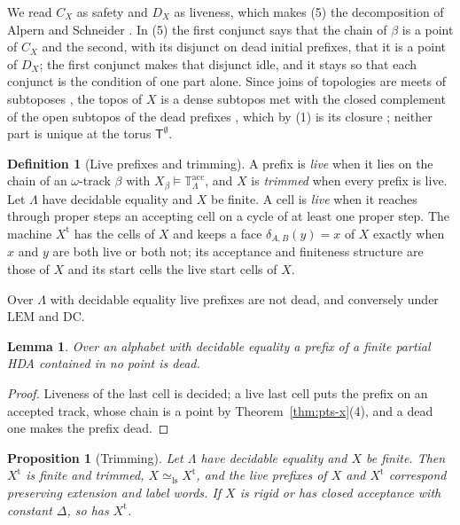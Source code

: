 \documentclass{lmcs}
\newtheorem{lemma}[theorem]{Lemma}
\newtheorem{proposition}[theorem]{Proposition}
\theoremstyle{definition}
\newtheorem{definition}[theorem]{Definition}
\theoremstyle{remark}
\newcommand{\Tt}{\mathbb{T}}
\newcommand{\prin}[1]{\mathrm{#1}}
\newcommand{\EM}{\prin{LEM}}
\newcommand{\eqLs}{\simeq_{\mathrm{ls}}}
\newcommand{\trim}[1]{#1^{\mathrm{t}}}
\providecommand{\DC}{\prin{DC}}
\providecommand{\Tacc}{\Tt^{\mathrm{acc}}_{\Lambda}}
\providecommand{\TB}[1]{\mathsf{T}^{#1}}
\begin{document}
We read $C_X$ as safety and $D_X$ as liveness, which makes (5) the decomposition of Alpern and Schneider \cite{AS85}.
In (5) the first conjunct says that the chain of $\beta$ is a point of $C_X$ and the second, with its disjunct on dead
initial prefixes, that it is a point of $D_X$; the
first conjunct makes that disjunct idle, and it stays so that each conjunct is the condition of one part alone. Since joins of
topologies are meets of subtoposes \cite{CL25b}\cite[Section~A4.5]{Johnstone02},
the topos of $X$ is a dense subtopos met with the closed complement of the open subtopos of the dead prefixes
\cite{CL25b},
which by (1) is its closure \cite{Caramello09}; neither part is
unique at the torus $\TB{\emptyset}$.

\begin{definition}[Live prefixes and trimming]\label{def:trim}
A prefix is \emph{live} when it lies on the chain of an $\omega$-track $\beta$ with
$X_\beta\models\Tacc$, and $X$ is \emph{trimmed} when every prefix is
live. Let $\Lambda$ have decidable equality and $X$ be finite. A cell is \emph{live} when it
reaches through proper steps an accepting cell on a cycle of at least one proper
step. The machine $\trim{X}$ has the cells of $X$ and keeps a face
$\delta_{A,B}(y)=x$ of $X$ exactly when $x$ and $y$ are both live or both not; its acceptance and
finiteness structure are those of $X$ and its start cells the live start cells of
$X$.
\end{definition}

Over $\Lambda$ with decidable equality live prefixes are not dead, and
conversely under $\EM$ and $\DC$.

\begin{lemma}\label{lem:no-point-dead}
Over an alphabet with decidable equality a prefix of a finite partial HDA contained in no point is dead.
\end{lemma}

\begin{proof}
Liveness of the last cell is decided; a live last cell puts the prefix on an accepted track, whose chain is a
point by Theorem~\ref{thm:pts-x}(4), and a dead one makes the prefix
dead.
\end{proof}

\begin{proposition}[Trimming]\label{prop:trim}
Let $\Lambda$ have decidable equality and $X$ be finite. Then $\trim{X}$ is finite and trimmed, $X\eqLs\trim{X}$, and
the live prefixes of $X$ and $\trim{X}$ correspond preserving extension and label words. If $X$ is rigid or has
closed acceptance with constant $\Delta$, so has $\trim{X}$.
\end{proposition}
\end{document}
